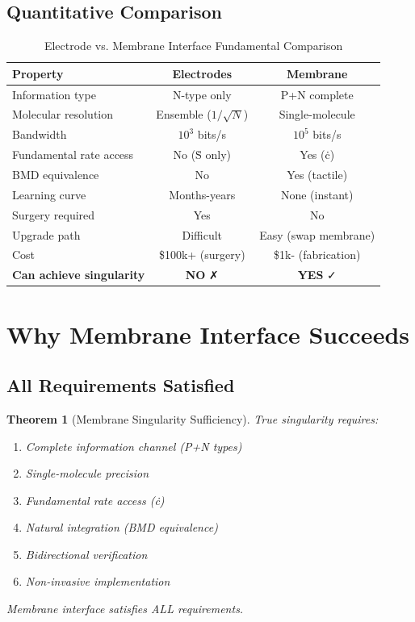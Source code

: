 \documentclass[11pt,a4paper]{article}
\newtheorem{theorem}{Theorem}[section]
\theoremstyle{definition}
\theoremstyle{remark}
\begin{document}
\subsection{Quantitative Comparison}

\begin{table}[h]
\centering
\caption{Electrode vs. Membrane Interface Fundamental Comparison}
\begin{tabular}{lcc}
\toprule
\textbf{Property} & \textbf{Electrodes} & \textbf{Membrane} \\
\midrule
Information type & N-type only & P+N complete \\
Molecular resolution & Ensemble ($1/\sqrt{N}$) & Single-molecule \\
Bandwidth & $10^3$ bits/s & $10^5$ bits/s \\
Fundamental rate access & No (Ṡ only) & Yes (ċ) \\
BMD equivalence & No & Yes (tactile) \\
Learning curve & Months-years & None (instant) \\
Surgery required & Yes & No \\
Upgrade path & Difficult & Easy (swap membrane) \\
Cost & \$100k+ (surgery) & \$1k- (fabrication) \\
\textbf{Can achieve singularity} & \textbf{NO} ✗ & \textbf{YES} ✓ \\
\bottomrule
\end{tabular}
\end{table}

\section{Why Membrane Interface Succeeds}

\subsection{All Requirements Satisfied}

\begin{theorem}[Membrane Singularity Sufficiency]
True singularity requires:
\begin{enumerate}
\item Complete information channel (P+N types)
\item Single-molecule precision
\item Fundamental rate access (ċ)
\item Natural integration (BMD equivalence)
\item Bidirectional verification
\item Non-invasive implementation
\end{enumerate}

Membrane interface satisfies ALL requirements.
\end{theorem}
\end{document}
